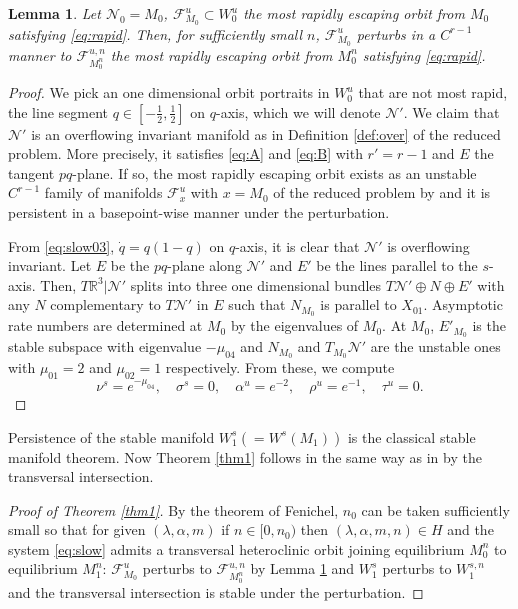 \documentclass[a4paper,11pt]{article}
\newtheorem{lemma}{Lemma}[section]
\theoremstyle{remark}
\begin{document}
\begin{lemma} \label{lem:rapid}
 Let $\mathcal{N}_0=M_0$, $\mathcal{F}^u_{M_0}\subset W_0^u$ the most rapidly escaping orbit from $M_0$ satisfying \eqref{eq:rapid}. Then, for sufficiently small $n$, $\mathcal{F}^u_{M_0}$ perturbs in a $C^{r-1}$ manner to $\mathcal{F}^{u,n}_{M_0^n}$ the most rapidly escaping orbit from $M_0^n$ satisfying \eqref{eq:rapid}. 
\end{lemma}
\begin{proof}
 We pick an one dimensional orbit portraits in $W_0^u$ that are not most rapid, the line segment $q\in [- \frac{1}{2}, \frac{1}{2}]$ on $q$-axis, which we will denote ${\mathcal{N}}'$. We claim that ${\mathcal{N}}'$ is an overflowing invariant manifold as in Definition \ref{def:over} of the reduced problem. More precisely, it satisfies \eqref{eq:A} and \eqref{eq:B} with $r'=r-1$ and $E$ the tangent $pq$-plane. If so, the most rapidly escaping orbit exists as an unstable $C^{r-1}$ family of manifolds $\mathcal{F}^u_x$ with $x=M_0$ of the reduced problem by \cite[Theorem 3]{fenichel_asymptotic_1977} and it is persistent in a basepoint-wise manner under the perturbation.
 
 From \eqref{eq:slow03}, $\dot{q}=q(1-q)$ on $q$-axis, it is clear that ${\mathcal{N}}'$ is overflowing invariant. Let $E$ be the $pq$-plane along ${\mathcal{N}}'$ and $E'$ be the lines parallel to the $s$-axis. Then, $T \mathbb{R}^3|{\mathcal{N}}'$ splits into three one dimensional bundles $T{\mathcal{N}}'\oplus N \oplus E'$ with any $N$ complementary to $T{\mathcal{N}}'$ in $E$ such that $N_{M_0}$ is parallel to $X_{01}$.  %
 Asymptotic rate numbers are determined at $M_0$ by the eigenvalues of $M_0$. At $M_0$, $E'_{M_0}$ is the stable subspace with eigenvalue $-\mu_{04}$ and $N_{M_0}$ and $T_{M_0}{\mathcal{N}}'$ are the unstable ones with $\mu_{01}=2$ and $\mu_{02}=1$ respectively. From these, we compute 
 $$ \nu^s = e^{-\mu_{04}}, \quad\sigma^s = 0, \quad\alpha^u = e^{-2}, \quad\rho^u=e^{-1}, \quad\tau^u=0.$$
\end{proof}
Persistence of the stable manifold $W_1^s (= W^s(M_1))$ is the classical stable manifold theorem. Now Theorem \ref{thm1} follows in the same way as in \cite[Theorem 3.1]{Sz1991} by the transversal intersection.

\begin{proof}[Proof of Theorem \ref{thm1}] 
 By the theorem of Fenichel, $n_0$ can be taken sufficiently small so that for given $(\lambda,\alpha,m)$ if $n \in [0, n_0)$ then $(\lambda,\alpha,m,n) \in H$ and  the system  \eqref{eq:slow} admits a transversal heteroclinic orbit joining equilibrium $M_0^{n}$ to equilibrium $M_1^{n}$: $\mathcal{F}^u_{M_0}$ perturbs to $\mathcal{F}^{u,n}_{M_0^n}$ by Lemma \ref{lem:rapid} and $W_1^s$ perturbs to $W_1^{s,n}$ and the transversal intersection is stable under the perturbation. 
\end{proof}
\end{document}
